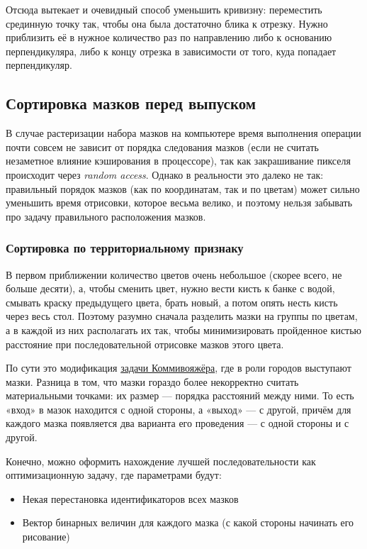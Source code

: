 Отсюда вытекает и очевидный способ уменьшить кривизну: переместить срединную точку так, чтобы она была достаточно блика к отрезку.
Нужно приблизить её в нужное количество раз по направлению либо к основанию перпендикуляра,
либо к концу отрезка в зависимости от того, куда попадает перпендикуляр.


\subsection{Сортировка мазков перед выпуском}\label{subsec:stroke_sorting}

В случае растеризации набора мазков на компьютере время выполнения операции почти совсем не зависит от порядка следования мазков
(если не считать незаметное влияние кэширования в процессоре), так как закрашивание пикселя происходит через \textit{random access}.
Однако в реальности это далеко не так: правильный порядок мазков (как по координатам, так и по цветам) может сильно уменьшить время отрисовки, которое весьма велико,
и поэтому нельзя забывать про задачу правильного расположения мазков.

\subsubsection{Сортировка по территориальному признаку}
В первом приближении количество цветов очень небольшое (скорее всего, не больше десяти),
а, чтобы сменить цвет, нужно вести кисть к банке с водой, смывать краску предыдущего цвета, брать новый,
а потом опять несть кисть через весь стол.
Поэтому разумно сначала разделить мазки на группы по цветам, а в каждой из них располагать их так,
чтобы минимизировать пройденное кистью расстояние при последовательной отрисовке мазков этого цвета.

По сути это модификация \href{https://en.wikipedia.org/wiki/Travelling_salesman_problem}{задачи Коммивояжёра}, где в роли городов выступают мазки.
Разница в том, что мазки гораздо более некорректно считать материальными точками: их размер — порядка расстояний между ними.
То есть «вход» в мазок находится с одной стороны, а «выход» — с другой, причём для каждого мазка появляется два варианта его проведения —
с одной стороны и с другой.

Конечно, можно оформить нахождение лучшей последовательности как оптимизационную задачу,
где параметрами будут:
\begin{itemize}
    \item Некая перестановка идентификаторов всех мазков
    \item Вектор бинарных величин для каждого мазка (с какой стороны начинать его рисование)
\end{itemize}

